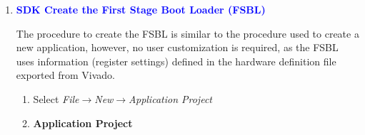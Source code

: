 \begin{enumerate}
\begin{figure}
\begin{center}
\begin{minipage}{0.8\textwidth}
\begin{lstlisting}
int main()
{
	int i = 0;

	init_platform();

	xil_printf("MiniZed Blinky GPIO MIO Example\r\n");
	xil_printf("-------------------------------\r\n");

	// Clear the data (DATA) bits
	*(volatile unsigned int *)0xE000A00C = 0xFFCF0000;

	// Set the direction (DIRM) to output
	*(volatile unsigned int *)0xE000A244 = 0x00300000;

	// Enable the outputs (OEN)
	*(volatile unsigned int *)0xE000A248 = 0x00300000;

	// Blink the bicolor LED
	while (1) {
		switch (i%4) {
			case 0:
				xil_printf("%d: Off\r\n", i);
				*(volatile unsigned int *)0xE000A00C = 0xFFCF0000;
				break;

			case 1:
				xil_printf("%d: Green\r\n", i);
				*(volatile unsigned int *)0xE000A00C = 0xFFCF0020;
				break;

			case 2:
				xil_printf("%d: Red\r\n", i);
				*(volatile unsigned int *)0xE000A00C = 0xFFCF0010;
				break;

			default:
				xil_printf("%d: Amber\r\n", i);
				*(volatile unsigned int *)0xE000A00C = 0xFFCF0030;
				break;
		}
		sleep(1);
		i++;
	}

    cleanup_platform();
    return 0;
}
\end{lstlisting}
\end{minipage}
\end{center}
\caption{PS bicolor LED GPIO MIO bare-metal application.}
\label{fig:blinky_gpio_mio_app}
\end{figure}

%
\item \textcolor{blue}{\textbf{SDK Create the First Stage Boot Loader (FSBL)}}

The procedure to create the FSBL is similar to the procedure used to
create a new application, however, no user customization is required, as the
FSBL uses information (register settings) defined in the hardware definition
file exported from Vivado.

\begin{enumerate}
\item Select \emph{File}$\rightarrow$\emph{New}$\rightarrow$\emph{Application Project}
\item \textbf{Application Project}


\end{enumerate}
\end{enumerate}
